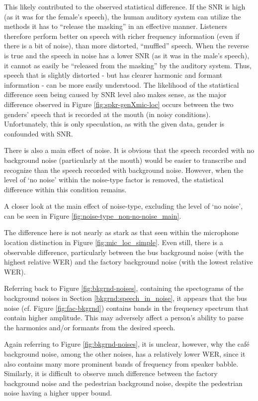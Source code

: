 \documentclass[dissertation,copyright]{uathesis}
\begin{document}
This likely contributed to the observed statistical difference.  If the SNR is high (as it was for the female's speech), the human auditory system can utilize the methods it has to ``release the masking'' in an effective manner.  Listeners therefore perform better on speech with richer frequency information (even if there is a bit of noise), than more distorted, ``muffled'' speech.  When the reverse is true and the speech in noise has a lower SNR (as it was in the male's speech), it cannot as easily be ``released from the masking'' by the auditory system.  Thus, speech that is slightly distorted - but has clearer harmonic and formant information - can be more easily understood.  The likelihood of the statistical difference seen being caused by SNR level also makes sense, as the major difference observed in Figure \ref{fig:spkr-genXmic-loc} occurs between the two genders' speech that is recorded at the mouth (in noisy conditions).  Unfortunately, this is only speculation, as with the given data, gender is confounded with SNR.

There is also a main effect of noise.  It is obvious that the speech recorded with no background noise (particularly at the mouth) would be easier to transcribe and recognize than the speech recorded with background noise.  However, when the level of `no noise' within the noise-type factor is removed, the statistical difference within this condition remains.

A closer look at the main effect of noise-type, excluding the level of `no noise', can be seen in Figure \ref{fig:noise-type_non-no-noise_main}.

The difference here is not nearly as stark as that seen within the microphone location distinction in Figure \ref{fig:mic_loc_simple}.  Even still, there is a observable difference, particularly between the bus background noise (with the highest relative WER) and the factory background noise (with the lowest relative WER).

Referring back to Figure \ref{fig:bkgrnd-noises}, containing the spectograms of the background noises in Section \ref{bkgrnd:speech_in_noise}, it appears that the bus noise (cf. Figure \ref{fig:fac-bkgrnd}) contains bands in the frequency spectrum that contain higher amplitude.
This may adversely affect a person's ability to parse the harmonics and/or formants from the desired speech. 

Again referring to Figure \ref{fig:bkgrnd-noises}, it is unclear, however, why the caf\'{e} background noise, among the other noises, has a relatively lower WER, since it also contains many more prominent bands of frequency from speaker babble. 
Similarly, it is difficult to observe much difference between the factory background noise and the pedestrian background noise, despite the pedestrian noise having a higher upper bound.
\end{document}
